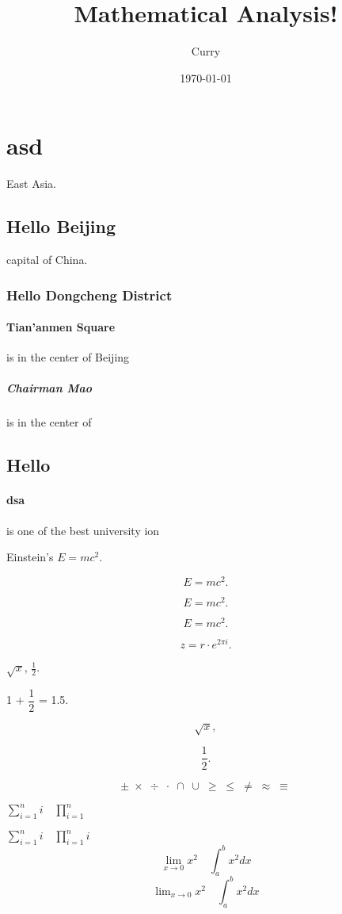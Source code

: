 \documentclass{article}
\begin{document}
\title{Mathematical Analysis!}
\author{Curry}
\date{\today}
\maketitle


\tableofcontents

\section{asd}
East Asia.
\subsection{Hello Beijing}
capital of China.
\subsubsection{Hello Dongcheng District}
\paragraph{Tian'anmen Square}
is in the center of Beijing
\subparagraph{Chairman Mao}
is in the center of
\subsection{Hello }
\paragraph{dsa} is one of the best university ion

Einstein's \(E=mc^2\).

\[ E=mc^2. \]

\begin{equation}
	E=mc^2.
\end{equation}

\begin{equation*}
	E=mc^2.
\end{equation*}

\[ z = r\cdot e^{2\pi i}. \]

$\sqrt{x}$, $\frac{1}{2}$.

1 + $\dfrac{1}{2}$ = 1.5.

\[ \sqrt{x}, \]

\[ \frac{1}{2}. \]

\[ \pm\; \times \; \div\; \cdot\; \cap\; \cup\;
	\geq\; \leq\; \neq\; \approx \; \equiv \]

$ \sum_{i=1}^n i\quad \prod_{i=1}^n $


$ \sum\limits_{i=1}^n i\quad \prod\limits _{i=1}^n i$
\[ \lim_{x\to0}x^2 \quad \int_a^b x^2 dx \]
\[ \lim\nolimits _{x\to0}x^2\quad \int\nolimits_a^b x^2 dx \]
\end{document}
